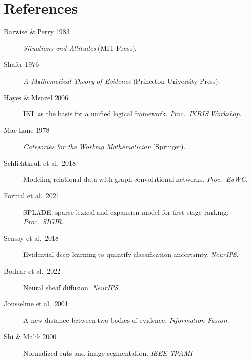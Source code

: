 \documentclass[11pt,a4paper]{article}
\begin{document}
\section*{References}

\begin{description}
\item[Barwise \& Perry 1983] \emph{Situations and Attitudes}
  (MIT Press).
\item[Shafer 1976] \emph{A Mathematical Theory of Evidence}
  (Princeton University Press).
\item[Hayes \& Menzel 2006] IKL as the basis for a unified
  logical framework. \emph{Proc.\ IKRIS Workshop}.
\item[Mac Lane 1978] \emph{Categories for the Working
  Mathematician} (Springer).
\item[Schlichtkrull et al.\ 2018] Modeling relational data
  with graph convolutional networks. \emph{Proc.\ ESWC}.
\item[Formal et al.\ 2021] SPLADE: sparse lexical and
  expansion model for first stage ranking. \emph{Proc.\ SIGIR}.
\item[Sensoy et al.\ 2018] Evidential deep learning to
  quantify classification uncertainty. \emph{NeurIPS}.
\item[Bodnar et al.\ 2022] Neural sheaf diffusion.
  \emph{NeurIPS}.
\item[Jousselme et al.\ 2001] A new distance between two
  bodies of evidence. \emph{Information Fusion}.
\item[Shi \& Malik 2000] Normalized cuts and image
  segmentation. \emph{IEEE TPAMI}.
\end{description}
\end{document}
